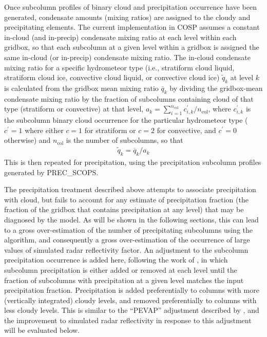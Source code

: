 Once subcolumn profiles of binary cloud and precipitation occurrence
have been generated, condensate amounts (mixing ratios) are assigned to
the cloudy and precipitating elements. The current implementation in
COSP assumes a constant in-cloud (and in-precip) condensate mixing ratio
at each level within each gridbox, so that each subcolumn at a given
level within a gridbox is assigned the same in-cloud (or in-precip)
condensate mixing ratio. The in-cloud condensate mixing ratio for a
specific hydrometeor type (i.e., stratiform cloud liquid, stratiform
cloud ice, convective cloud liquid, or convective cloud ice)
\(\tilde{q}_k\) at level \(k\) is calculated from the gridbox mean
mixing ratio \(\overline{q}_k\) by dividing the gridbox-mean condensate
mixing ratio by the fraction of subcolumns containing cloud of that type
(stratiform or convective) at that level,
\(a_k = \sum_{i = 1}^{n_\textrm{col}} c^\prime_{i, k} / n_\textrm{col}\),
where \(c^{\prime}_{i, k}\) is the subcolumn binary cloud occurrence for
the particular hydrometeor type (\(c^\prime = 1\) where either \(c = 1\)
for stratiform or \(c = 2\) for convective, and \(c^\prime = 0\)
otherwise) and \(n_\textrm{col}\) is the number of subcolumns, so that
\[\begin{gathered}
\tilde{q}_k = \overline{q}_k / a_k\end{gathered}\] This is then repeated
for precipitation, using the precipitation subcolumn profiles generated
by PREC\_SCOPS.

The precipitation treatment described above attempts to associate
precipitation with cloud, but fails to account for any estimate of
precipitation fraction (the fraction of the gridbox that contains
precipitation at any level) that may be diagnosed by the model. As will
be shown in the following sections, this can lead to a gross
over-estimation of the number of precipitating subcolumns using the
\citet{zhang_et_al_2010} algorithm, and consequently a gross
over-estimation of the occurrence of large values of simulated radar
reflectivity factor. An adjustment to the subcolumn precipitation
occurrence is added here, following the work of
\citet{dimichele_et_al_2012}, in which subcolumn precipitation is either
added or removed at each level until the fraction of subcolumns with
precipitation at a given level matches the input precipitation fraction.
Precipitation is added preferentially to columns with more (vertically
integrated) cloudy levels, and removed preferentially to columns with
less cloudy levels. This is similar to the ``PEVAP'' adjustment
described by \citet{dimichele_et_al_2012}, and the improvement to
simulated radar reflectivity in response to this adjustment will be
evaluated below.

